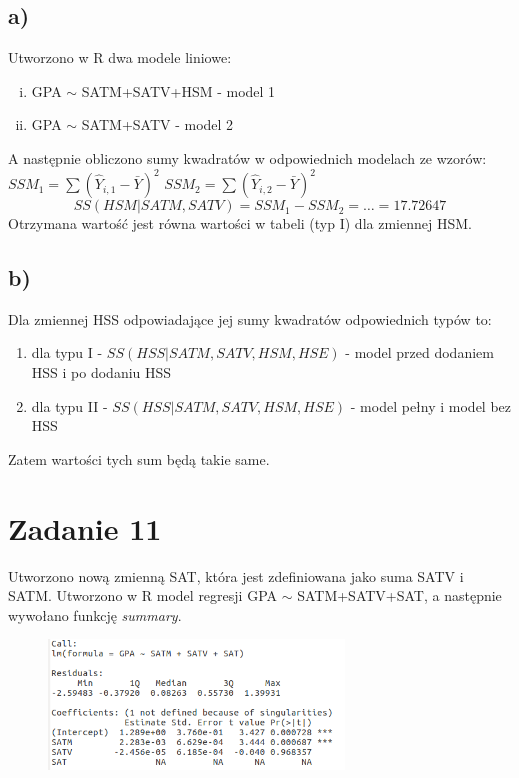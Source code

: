 \documentclass[9pt]{article}  %
\begin{document}
  \subsection{a)}
  Utworzono w R dwa modele liniowe:
  \begin{enumerate}[i)]
  \item GPA $\sim$ SATM+SATV+HSM - model 1
  \item GPA $\sim$ SATM+SATV - model 2
  \end{enumerate}
  
  A następnie obliczono sumy kwadratów w odpowiednich modelach ze wzorów: \newline
  $SSM_1 = \sum{(\hat{Y}_{i,1} - \bar{Y})^2 }$ \newline
  $SSM_2 = \sum{(\hat{Y}_{i,2} - \bar{Y})^2 }$ \newline
  $$SS(HSM | SATM, SATV) = SSM_1 - SSM_2 = \dots = 17.72647 $$
  Otrzymana wartość jest równa wartości w tabeli (typ I) dla zmiennej HSM.
  
  \subsection{b)}
  Dla zmiennej HSS odpowiadające jej sumy kwadratów odpowiednich typów to:
    \begin{enumerate}[1)]
  \item dla typu I - $SS(HSS | SATM,SATV,HSM,HSE)$ - model przed dodaniem HSS i po dodaniu HSS
  \item dla typu II - $SS(HSS | SATM,SATV,HSM,HSE)$ - model pełny i model bez HSS
  \end{enumerate}
  Zatem wartości tych sum będą takie same.


\section{Zadanie 11}
  Utworzono nową zmienną SAT, która jest zdefiniowana jako suma SATV i SATM. Utworzono w R model regresji GPA $\sim$ SATM+SATV+SAT, a następnie wywołano funkcję \textit{summary}.

    \begin{figure}[H]
      \centering
      \includegraphics[width=0.7\textwidth]{11.png}
      \caption {}
    \end{figure} 
\end{document}
